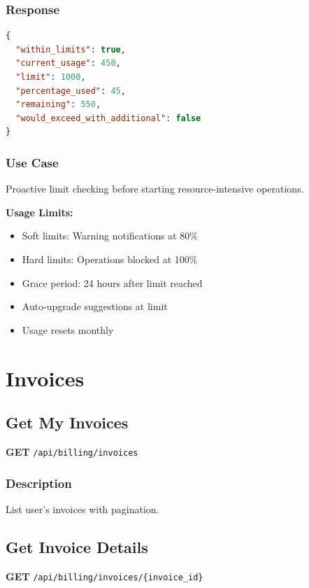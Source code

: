 \documentclass[11pt,a4paper]{report}
\begin{document}
\subsubsection{Response}
\begin{lstlisting}[style=jsoncode,language=json]
{
  "within_limits": true,
  "current_usage": 450,
  "limit": 1000,
  "percentage_used": 45,
  "remaining": 550,
  "would_exceed_with_additional": false
}
\end{lstlisting}

\subsubsection{Use Case}
Proactive limit checking before starting resource-intensive operations.

\begin{infobox}
\textbf{Usage Limits:}
\begin{itemize}[leftmargin=*]
    \item Soft limits: Warning notifications at 80\%
    \item Hard limits: Operations blocked at 100\%
    \item Grace period: 24 hours after limit reached
    \item Auto-upgrade suggestions at limit
    \item Usage resets monthly
\end{itemize}
\end{infobox}

\section{Invoices}

\subsection{Get My Invoices}

\textbf{GET} \texttt{/api/billing/invoices}

\subsubsection{Description}
List user's invoices with pagination.

\subsection{Get Invoice Details}

\textbf{GET} \texttt{/api/billing/invoices/\{invoice\_id\}}
\end{document}
